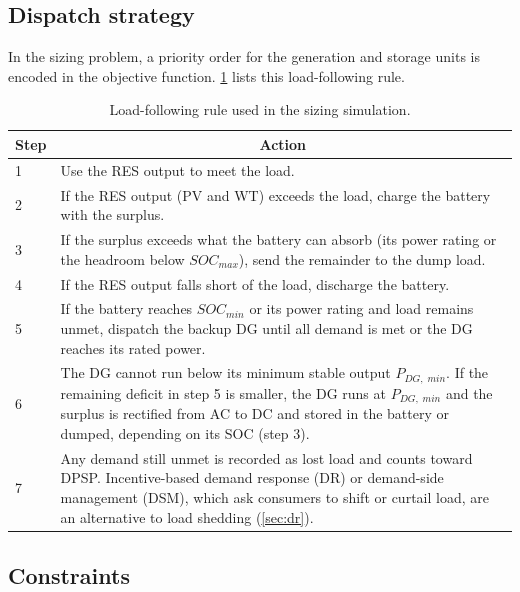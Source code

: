 \documentclass[final,3p,times]{elsarticle}
\begin{document}
\subsection{Dispatch strategy \label{sec:disp_strat}}
In the sizing problem, a priority order for the generation and storage units is encoded in the objective function. \cref{tab:dispatch_strat_for_sizing} lists this load-following rule.
\begin{table}[htbp]
\centering
\begin{tabular}{p{0.75cm} p{13cm}}
\toprule
\multicolumn{1}{c}{\textbf{Step}} & \multicolumn{1}{c}{\textbf{Action}}    \\
\midrule
1 & Use the RES output to meet the load. \\ [1ex]
2 & If the RES output (PV and WT) exceeds the load, charge the battery with the surplus. \\ [1ex]
3 & If the surplus exceeds what the battery can absorb (its power rating or the headroom below $SOC_{max}$), send the remainder to the dump load. \\ [1ex]
4 & If the RES output falls short of the load, discharge the battery. \\ [1ex]
5 & If the battery reaches $SOC_{min}$ or its power rating and load remains unmet, dispatch the backup DG until all demand is met or the DG reaches its rated power. \\ [1ex]
6 & The DG cannot run below its minimum stable output $P_{DG,\;min}$. If the remaining deficit in step 5 is smaller, the DG runs at $P_{DG,\;min}$ and the surplus is rectified from AC to DC and stored in the battery or dumped, depending on its SOC (step 3). \\ [1ex]
7 & Any demand still unmet is recorded as lost load and counts toward DPSP. Incentive-based demand response (DR) or demand-side management (DSM), which ask consumers to shift or curtail load, are an alternative to load shedding (\cref{sec:dr}). \\ [1ex]
\bottomrule
\end{tabular}
\caption{Load-following rule used in the sizing simulation.}
\label{tab:dispatch_strat_for_sizing} 
\end{table}

\subsection{Constraints}
\end{document}
